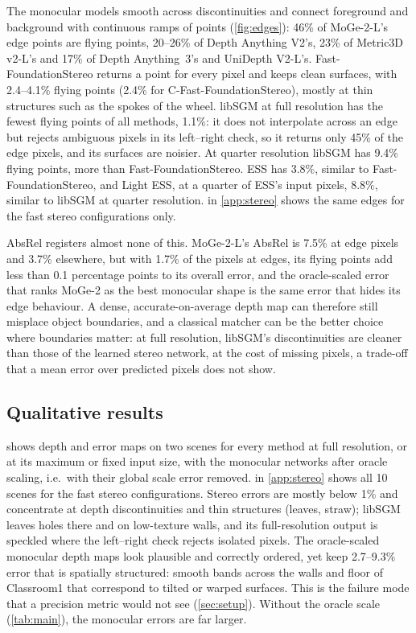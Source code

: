 \documentclass[10pt,twocolumn]{article}
\begin{document}
The monocular models smooth across discontinuities and connect foreground and background with
continuous ramps of points (\cref{fig:edges}): 46\% of MoGe-2-L's edge points are flying points, 20--26\%
of Depth Anything V2's, 23\% of Metric3D v2-L's and 17\% of Depth Anything~3's and UniDepth V2-L's. Fast-FoundationStereo returns a point for every
pixel and keeps clean surfaces, with 2.4--4.1\% flying points (2.4\% for C-Fast-FoundationStereo),
mostly at thin structures such as the spokes of the wheel. libSGM at full resolution has the fewest flying points of all methods, 1.1\%: it
does not interpolate across an edge but rejects ambiguous pixels in its left--right check, so it returns
only 45\% of the edge pixels, and its surfaces are noisier. At quarter resolution libSGM has 9.4\% flying
points, more than Fast-FoundationStereo. ESS has 3.8\%, similar to Fast-FoundationStereo, and Light
ESS, at a quarter of ESS's input pixels, 8.8\%, similar to libSGM at quarter resolution.  in \cref{app:stereo} shows the same
edges for the fast stereo configurations only.

AbsRel registers almost none of this. MoGe-2-L's AbsRel is 7.5\% at edge pixels and 3.7\% elsewhere,
but with 1.7\% of the pixels at edges, its flying points add less than 0.1 percentage points to its
overall error, and the oracle-scaled error that ranks MoGe-2 as the best monocular shape is the same
error that hides its edge behaviour. A dense, accurate-on-average depth map can therefore still
misplace object boundaries, and a classical matcher can be the better choice where boundaries matter:
at full resolution, libSGM's discontinuities are cleaner than those of the learned stereo network,
at the cost of missing pixels, a trade-off that a mean error over predicted pixels does not show.

\subsection{Qualitative results}
\label{sec:qualitative}
 shows depth and error maps on two scenes for every
method at full resolution, or at its maximum or fixed input size, with the monocular networks after
oracle scaling, i.e.\ with their global scale error removed.  in \cref{app:stereo} shows
all 10 scenes for the fast stereo configurations. Stereo errors are mostly below 1\% and
concentrate at depth discontinuities and thin structures (leaves, straw); libSGM leaves holes there and
on low-texture walls, and its full-resolution output is speckled where the left--right check rejects
isolated pixels. The oracle-scaled monocular depth maps look plausible and correctly ordered, yet keep
2.7--9.3\% error that is spatially structured: smooth bands across the walls and floor of Classroom1
that correspond to tilted or warped surfaces. This is the failure mode that a precision metric would
not see (\cref{sec:setup}). Without the oracle scale (\cref{tab:main}), the monocular errors are far
larger.
\end{document}
